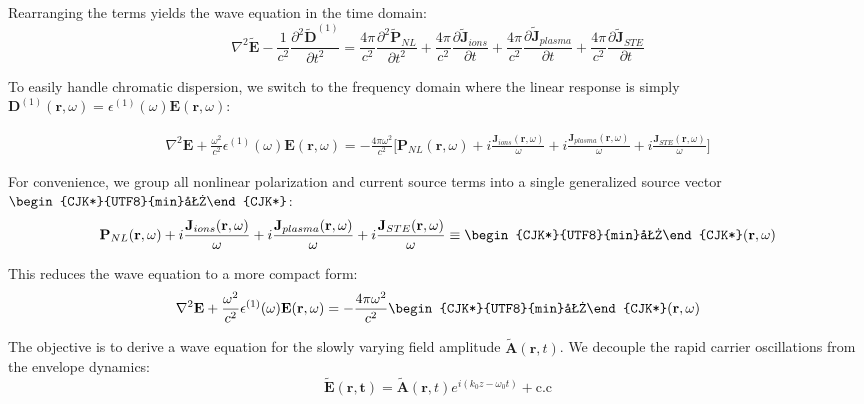 \documentclass[11pt,a4paper]{article}
\newcommand{\kii}{\text{\begin{CJK*}{UTF8}{min}力\end{CJK*}}}
\begin{document}
Rearranging the terms yields the wave equation in the time domain:
\begin{equation*}
\nabla^2 \tilde{\mathbf{E}} - \frac{1}{c^2} \frac{\partial^2 \tilde{\mathbf{D}}^{(1)}}{\partial t^2}= \frac{4\pi}{c^2}\frac{\partial^2\tilde{\mathbf{P}}_{NL}}{\partial t^2} +\frac{4\pi}{c^2} \frac{\partial \tilde{\mathbf{J}}_{ions}}{\partial t}+\frac{4\pi}{c^2} \frac{\partial \tilde{\mathbf{J}}_{plasma}}{\partial t}+\frac{4\pi}{c^2} \frac{\partial \tilde{\mathbf{J}}_{STE}}{\partial t}
\end{equation*}

To easily handle chromatic dispersion, we switch to the frequency domain where the linear response is simply $\mathbf{D}^{(1)}(\mathbf{r},\omega)=\epsilon^{(1)}(\omega)\mathbf{E}(\mathbf{r},\omega)$: 

\begin{equation*}
\begin{split}
\nabla^2 \mathbf{E} + \frac{\omega^2}{c^2}\epsilon^{(1)}(\omega)\mathbf{E}(\mathbf{r},\omega) = -\frac{4\pi\omega^2}{c^2}\Bigg[\mathbf{P}_{NL}(\mathbf{r},\omega) +i\frac{\mathbf{J}_{ions}(\mathbf{r},\omega)}{\omega}+i\frac{\mathbf{J}_{plasma}(\mathbf{r},\omega)}{\omega}+i\frac{\mathbf{J}_{STE}(\mathbf{r},\omega)}{\omega}\Bigg]
\end{split}
\end{equation*}

For convenience, we group all nonlinear polarization and current source terms into a single generalized source vector $\kii$:
\begin{equation*}
\mathbf{P}_{NL}(\mathbf{r},\omega) +i\frac{\mathbf{J}_{ions}(\mathbf{r},\omega)}{\omega}+i\frac{\mathbf{J}_{plasma}(\mathbf{r},\omega)}{\omega}+i\frac{\mathbf{J}_{STE}(\mathbf{r},\omega)}{\omega}\equiv \kii(\mathbf{r},\omega)
\end{equation*}

This reduces the wave equation to a more compact form:
\begin{equation*}
\nabla^2 \mathbf{E} + \frac{\omega^2}{c^2}\epsilon^{(1)}(\omega)\mathbf{E}(\mathbf{r},\omega)= -\frac{4\pi\omega^2}{c^2}\kii(\mathbf{r},\omega)
\end{equation*}

The objective is to derive a wave equation for the slowly varying field amplitude $\tilde{\mathbf{A}}(\mathbf{r},t)$. We decouple the rapid carrier oscillations from the envelope dynamics:
\begin{equation*}
\tilde{\mathbf{E}}({\mathbf{r,t}}) = \tilde{\mathbf{A}}(\mathbf{r},t) e^{i(k_0z-\omega_0t)} + \text{c.c}
\end{equation*}
\end{document}
